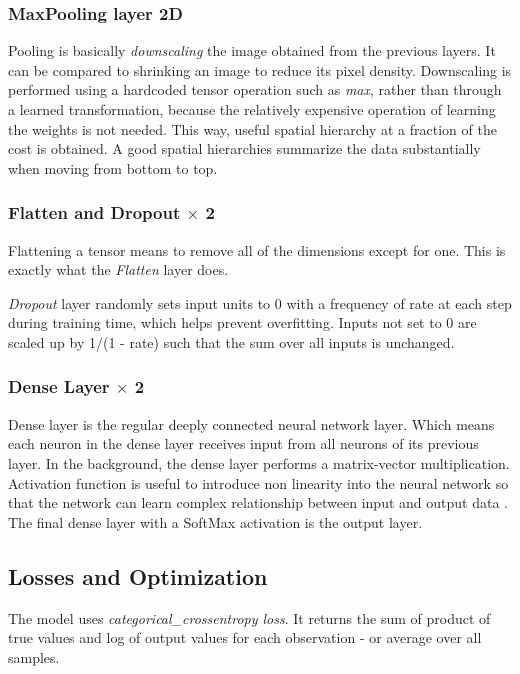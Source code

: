 \documentclass[12pt, a4paper]{report}
\begin{document}
\subsubsection{MaxPooling layer 2D}
\label{subsubsec:maxpool2d}
Pooling is basically \textit{downscaling} the image obtained from the previous layers. It can be compared to shrinking an image to reduce its pixel density. Downscaling is performed using a hardcoded tensor operation such as \textit{max}, rather than through a learned transformation, because the relatively expensive operation of learning the weights \cite{2017arXiv170603059K} is not needed. This way, useful spatial hierarchy at a fraction of the cost is obtained. A good spatial hierarchies summarize the data substantially when moving from bottom to top.

\subsubsection{Flatten and Dropout \texorpdfstring{$\times$}{x} 2}
\label{subsubsec:drptfltn}
\hspace{0.5cm} Flattening a tensor means to remove all of the dimensions except for one. This is exactly what the \textit{Flatten} layer does.

\textit{Dropout} layer randomly sets input units to 0 with a frequency of rate at each step during training time, which helps prevent overfitting. Inputs not set to 0 are scaled up by 1/(1 - rate) such that the sum over all inputs is unchanged.

\subsubsection{Dense Layer \texorpdfstring{$\times$}{x} 2}
\label{subsubsec:dnslyr}
\hspace{0.5cm} Dense layer is the regular deeply connected neural network layer. Which means each neuron in the dense layer receives input from all neurons of its previous layer. In the background, the dense layer performs a matrix-vector multiplication. Activation function is useful to introduce non linearity into the neural network so that the network can learn complex relationship between input and output data \cite{art:kerasdense}. The final dense layer with a SoftMax activation is the output layer.

\subsection{Losses and Optimization}
\label{subsec:losoptz}
\hspace{0.5cm} The model uses \textit{categorical\_crossentropy loss}. It returns the sum of product of true values and log of output values for each observation - or average over all samples.
\end{document}
